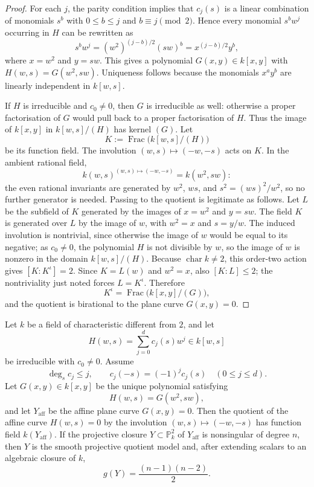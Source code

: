 \begin{proof}
For each \(j\), the parity condition implies that \(c_j(s)\) is a
linear combination of monomials \(s^b\) with \(0\le b\le j\) and
\(b\equiv j\pmod 2\). Hence every monomial \(s^bw^j\) occurring in
\(H\) can be rewritten as
\[
  s^bw^j=(w^2)^{(j-b)/2}(sw)^b=x^{(j-b)/2}y^b,
\]
where \(x=w^2\) and \(y=sw\). This gives a polynomial
\(G(x,y)\in k[x,y]\) with \(H(w,s)=G(w^2,sw)\). Uniqueness follows
because the monomials \(x^ay^b\) are linearly independent in
\(k[w,s]\).

If \(H\) is irreducible and \(c_0\ne0\), then \(G\) is irreducible as
well: otherwise a proper factorisation of \(G\) would pull back to a
proper factorisation of \(H\). Thus the image of \(k[x,y]\) in
\(k[w,s]/(H)\) has kernel \((G)\). Let
\[
  K:=\operatorname{Frac}\bigl(k[w,s]/(H)\bigr)
\]
be its function field. The involution \((w,s)\mapsto(-w,-s)\) acts on
\(K\). In the ambient rational field,
\[
  k(w,s)^{(w,s)\mapsto(-w,-s)}=k(w^2,sw):
\]
the even rational invariants are generated by \(w^2\), \(ws\), and
\(s^2=(ws)^2/w^2\), so no further generator is needed. Passing to the
quotient is legitimate as follows. Let \(L\) be the subfield of \(K\)
generated by the images of \(x=w^2\) and \(y=sw\). The field \(K\) is
generated over \(L\) by the image of \(w\), with \(w^2=x\) and
\(s=y/w\). The induced involution is nontrivial, since otherwise the image
of \(w\) would be equal to its negative; as \(c_0\ne0\), the polynomial
\(H\) is not divisible by \(w\), so the image of \(w\) is nonzero in the
domain \(k[w,s]/(H)\).
Because \(\operatorname{char} k\ne2\), this order-two action gives
\([K:K^\iota]=2\). Since \(K=L(w)\) and \(w^2=x\), also \([K:L]\le2\);
the nontriviality just noted forces \(L=K^\iota\). Therefore
\[
  K^\iota=\operatorname{Frac}\bigl(k[x,y]/(G)\bigr),
\]
and the quotient is birational to the plane curve \(G(x,y)=0\).

\end{proof}

\begin{theorem}
  \label{thm:sign-quotient-plane-genus}
  Let \(k\) be a field of characteristic different from \(2\), and let
  \[
    H(w,s)=\sum_{j=0}^d c_j(s)w^j\in k[w,s]
  \]
  be irreducible with \(c_0\ne0\). Assume
  \[
    \deg_s c_j\le j,\qquad c_j(-s)=(-1)^jc_j(s)
    \quad (0\le j\le d).
  \]
  Let \(G(x,y)\in k[x,y]\) be the unique polynomial satisfying
  \[
    H(w,s)=G(w^2,sw),
  \]
  and let \(Y_{\mathrm{aff}}\) be the affine plane curve \(G(x,y)=0\).
  Then the quotient of the affine curve \(H(w,s)=0\) by the involution
  \((w,s)\mapsto(-w,-s)\) has function field \(k(Y_{\mathrm{aff}})\).
  If the projective closure \(Y\subset\mathbb P^2_k\) of
  \(Y_{\mathrm{aff}}\) is nonsingular of degree \(n\), then \(Y\) is the
  smooth projective quotient model and, after extending scalars to an
  algebraic closure of \(k\),
  \[
    g(Y)=\frac{(n-1)(n-2)}2.
  \]
\end{theorem}

